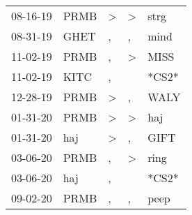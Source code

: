 \begin{supertabular}{p{0.07\textwidth}p{0.06\textwidth}p{0.02\textwidth}p{0.02\textwidth}p{0.06\textwidth}}
          08-16-19\textsuperscript{} &           PRMB\textsuperscript{} &     \textgreater &     \textgreater &           strg\textsuperscript{} \\
          08-31-19\textsuperscript{} &           GHET\textsuperscript{} &                , &                , &           mind\textsuperscript{} \\
          11-02-19\textsuperscript{} &           PRMB\textsuperscript{} &                , &     \textgreater &           MISS\textsuperscript{} \\
          11-02-19\textsuperscript{} &           KITC\textsuperscript{} &                , &                  &                            *CS2* \\
          12-28-19\textsuperscript{} &           PRMB\textsuperscript{} &     \textgreater &                , &           WALY\textsuperscript{} \\
          01-31-20\textsuperscript{} &           PRMB\textsuperscript{} &     \textgreater &     \textgreater &            haj\textsuperscript{} \\
          01-31-20\textsuperscript{} &            haj\textsuperscript{} &     \textgreater &                , &           GIFT\textsuperscript{} \\
          03-06-20\textsuperscript{} &           PRMB\textsuperscript{} &                , &     \textgreater &           ring\textsuperscript{} \\
          03-06-20\textsuperscript{} &            haj\textsuperscript{} &                , &                  &                            *CS2* \\
          09-02-20\textsuperscript{} &           PRMB\textsuperscript{} &                , &                , &           peep\textsuperscript{} \\
\end{supertabular}
